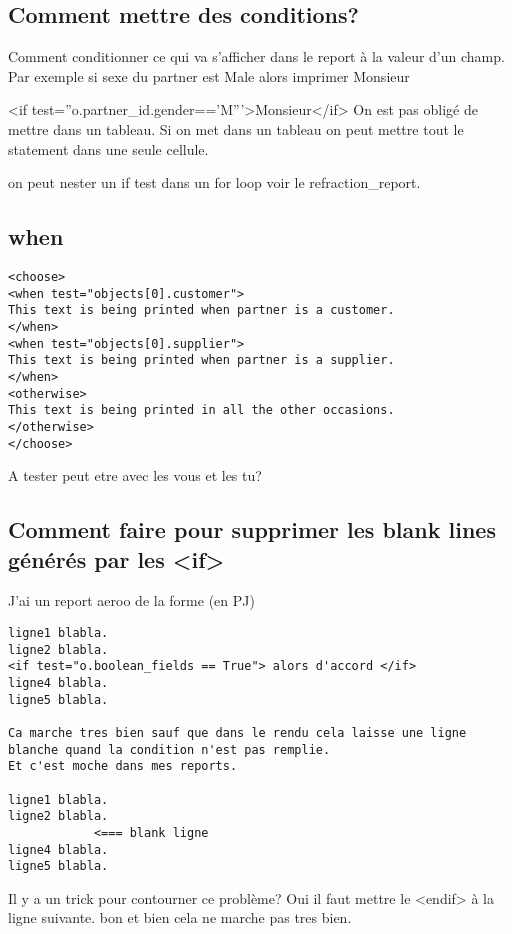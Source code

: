 \documentclass[12pt,a4paper]{article}
\begin{document}
\subsection{Comment mettre des conditions?}
\label{sec:conditions}

Comment conditionner ce qui va s'afficher dans le report à la valeur d'un champ. 
Par exemple si sexe du partner est Male alors imprimer Monsieur

<if test=''o.partner\_id.gender=='M'''>Monsieur</if>
On est pas obligé de mettre dans un tableau. 
Si on met dans un tableau on peut mettre tout le statement dans une seule cellule.

on peut nester un if test dans un for loop voir le refraction\_report.

\subsection{when}
\label{sec:when}


\begin{verbatim}
<choose>
<when test="objects[0].customer">
This text is being printed when partner is a customer.
</when>
<when test="objects[0].supplier">
This text is being printed when partner is a supplier.
</when>
<otherwise>
This text is being printed in all the other occasions.
</otherwise>
</choose>
\end{verbatim}

A tester peut etre avec les vous et les tu?

\subsection{Comment faire pour supprimer les blank lines générés par les <if>}
\label{sec:if_blank_line}


J'ai un report aeroo de la forme (en PJ)

\begin{verbatim}
ligne1 blabla.
ligne2 blabla.
<if test="o.boolean_fields == True"> alors d'accord </if>
ligne4 blabla.
ligne5 blabla.

Ca marche tres bien sauf que dans le rendu cela laisse une ligne 
blanche quand la condition n'est pas remplie. 
Et c'est moche dans mes reports.

ligne1 blabla.
ligne2 blabla. 
			<=== blank ligne
ligne4 blabla.
ligne5 blabla.
\end{verbatim}
Il y a un trick pour contourner ce problème?
Oui il faut mettre le <endif> à la ligne suivante.
bon et bien cela ne marche pas tres bien. 
 
\end{document}
